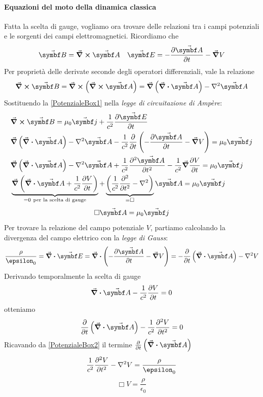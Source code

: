\paragraph{Equazioni del moto della dinamica classica}
Fatta la scelta di gauge, vogliamo ora trovare delle relazioni tra i campi potenziali e le sorgenti dei campi elettromagnetici. Ricordiamo che
\begin{align*}
	\vba{B}=\curl{\vba{A}} && \vba{E}=-\pdv{\vba{A}}{t}-\grad{V}
\end{align*}
Per proprietà delle derivate seconde degli operatori differenziali, vale la relazione
\begin{equation}
	\curl{\vba{B}}=\curl{\left(\curl{\vba{A}}\right)}=\grad{\left(\div{\vba{A}}\right)}-\laplacian{\vba{A}}\label{PotenzialeBox1}
\end{equation}
Sostituendo la \eqref{PotenzialeBox1} nella \textit{legge di circuitazione di Ampère}:
\begin{align*}
	&\curl{\vba{B}}=\mu_0\vba{j}+\frac{1}{c^2}\pdv{\vba{E}}{t}\\
	&\grad{\left(\div{\vba{A}}\right)}-\laplacian{\vba{A}}-\frac{1}{c^2}\pdv{t}\left(-\pdv{\vba{A}}{t}-\grad{V}\right)=\mu_0\vba{j}\\
	&\grad{\left(\div{\vba{A}}\right)}-\laplacian{\vba{A}}+\frac{1}{c^2}\pdv[2]{\vba{A}}{t}-\frac{1}{c^2}\grad{\pdv{V}{t}}=\mu_0\vba{j}\\
	&\underbrace{\grad{\left(\div{\vba{A}}+\frac{1}{c^2}\pdv{V}{t}\right)}}_{=0\ \text{per la scelta di gauge}}+\underbrace{\left(\frac{1}{c^2}\pdv[2]{t}-\laplacian\right)}_{=\Box}\vba{A}=\mu_0\vba{j}
\end{align*}
\begin{equation}
	\Box{\vba{A}}=\mu_0\vba{j}
\end{equation}
Per trovare la relazione del campo potenziale $V$, partiamo calcolando la divergenza del campo elettrico con la \textit{legge di Gauss}:
\begin{equation}
	\frac{\rho}{\epsilon_0}=\div{\vba{E}}=\div{\left(-\pdv{\vba{A}}{t}-\grad{V}\right)}=-\pdv{t}\left(\div{\vba{A}}\right)-\laplacian{V}
\end{equation}
Derivando temporalmente la scelta di gauge
\begin{equation*}
	\div{\vba{A}}-\frac{1}{c^2}\pdv{V}{t}=0
\end{equation*}
otteniamo
\begin{equation}
	\pdv{t}\left(\div{\vba{A}}\right)-\frac{1}{c^2}\pdv[2]{V}{t}=0 \label{PotenzialeBox2} 
\end{equation}
Ricavando da \eqref{PotenzialeBox2} il termine $\pdv{t}\left(\div{\vba{A}}\right)$
\begin{equation*}
	\frac{1}{c^2}\pdv[2]{V}{t}-\laplacian{V}=\frac{\rho}{\epsilon_0}
\end{equation*}
\begin{equation}
	\Box{V}=\frac{\rho}{\epsilon_0}
\end{equation}
